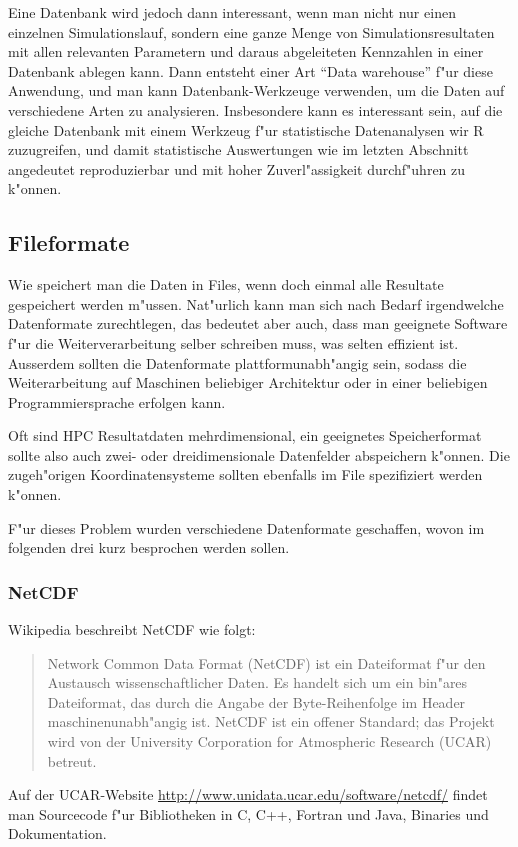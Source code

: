 Eine Datenbank wird jedoch dann interessant, wenn man nicht nur einen
einzelnen Simulationslauf, sondern eine ganze Menge von Simulationsresultaten
mit allen relevanten Parametern und daraus abgeleiteten Kennzahlen
in einer Datenbank ablegen kann.
Dann entsteht einer Art ``Data warehouse'' f"ur diese Anwendung,
und man kann Datenbank-Werkzeuge verwenden, um die Daten auf
verschiedene Arten zu analysieren. 
Insbesondere kann es interessant sein, auf die gleiche Datenbank
mit einem Werkzeug f"ur statistische Datenanalysen wir R zuzugreifen,
und damit statistische Auswertungen wie im letzten Abschnitt
angedeutet reproduzierbar und mit hoher Zuverl"assigkeit durchf"uhren
zu k"onnen.

\subsection{Fileformate}
Wie speichert man die Daten in Files, wenn doch einmal alle Resultate
gespeichert werden m"ussen.
Nat"urlich kann man sich nach Bedarf irgendwelche Datenformate zurechtlegen,
das bedeutet aber auch, dass man geeignete Software f"ur die
Weiterverarbeitung selber schreiben muss, was selten effizient ist.
Ausserdem sollten die Datenformate plattformunabh"angig sein,
sodass die Weiterarbeitung auf Maschinen beliebiger Architektur
oder in einer beliebigen Programmiersprache erfolgen kann.

Oft sind HPC Resultatdaten mehrdimensional, ein geeignetes Speicherformat
sollte also auch zwei- oder dreidimensionale Datenfelder abspeichern
k"onnen.
Die zugeh"origen Koordinatensysteme sollten ebenfalls im File
spezifiziert werden k"onnen.

F"ur dieses Problem wurden verschiedene Datenformate geschaffen, 
wovon im folgenden drei kurz besprochen werden sollen.

\subsubsection{NetCDF}
Wikipedia beschreibt NetCDF wie folgt:
\begin{quote}
Network Common Data Format (NetCDF) ist ein Dateiformat f"ur den
Austausch wissenschaftlicher Daten. Es handelt sich um ein bin"ares
Dateiformat, das durch die Angabe der Byte-Reihenfolge im Header
maschinenunabh"angig ist. NetCDF ist ein offener Standard; das Projekt
wird von der University Corporation for Atmospheric Research (UCAR)
betreut.
\end{quote}
Auf der UCAR-Website \url{http://www.unidata.ucar.edu/software/netcdf/}
findet man Sourcecode f"ur Bibliotheken in C, C++, Fortran und Java,
Binaries und Dokumentation. 

